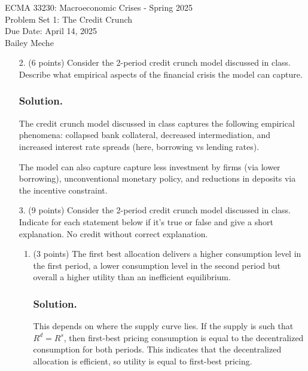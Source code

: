 \documentclass[12pt]{article}
\begin{document}
	\begin{center}
		ECMA 33230: Macroeconomic Crises - Spring 2025\\
        Problem Set 1: The Credit Crunch \\
		Due Date: April 14, 2025 \\
        Bailey Meche
	\end{center}



\begin{enumerate}
    \item[2.] (6 points)  Consider the 2-period credit crunch model discussed in class. Describe what empirical
aspects of the financial crisis the model can capture.
\subsubsection*{Solution.}

The credit crunch model discussed in class captures the following empirical phenomena: collapsed bank collateral, decreased intermediation, and increased interest rate spreads (here, borrowing vs lending rates).

The model can also capture capture less investment by firms (via lower borrowing), unconventional monetary policy, and reductions in deposits via the incentive constraint. 

    \item[3.] (9 points) Consider the 2-period credit crunch model discussed in class. Indicate for each statement below if it’s true or false and give a short explanation. No credit without correct explanation.
    \begin{enumerate}
        \item (3 points) The first best allocation delivers a higher consumption level in the first period, a
        lower consumption level in the second period but overall a higher utility than an inefficient
        equilibrium.
        \subsubsection*{Solution.}

        This depends on where the supply curve lies. If the supply is such that $R^d=R^s$, then first-best pricing consumption is equal to the decentralized consumption for both periods. This indicates that the decentralized allocation is efficient, so utility is equal to first-best pricing.


\end{enumerate}
\end{enumerate}
\end{document}
